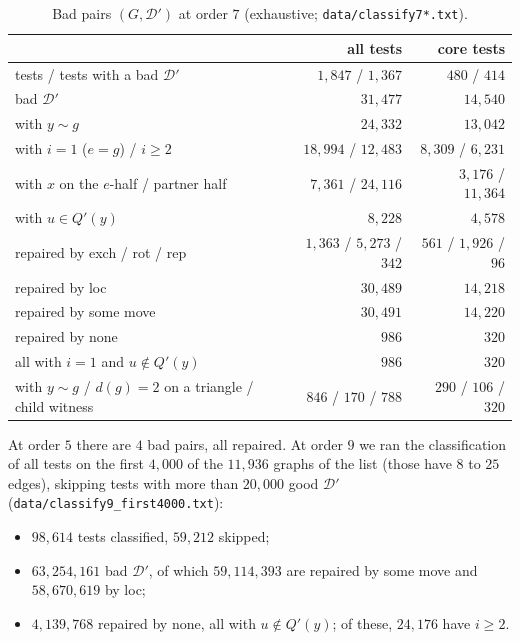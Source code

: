 \documentclass[11pt]{amsart}
\theoremstyle{definition}
\newcommand{\cD}{\mathcal D}
\begin{document}
\begin{table}[ht]
\caption{Bad pairs $(G,\cD')$ at order $7$ (exhaustive; \texttt{data/classify7*.txt}).}\label{tab:class7}
\small
\begin{tabular}{@{}lrr@{}}
\toprule
 & all tests & core tests\\
\midrule
tests / tests with a bad $\cD'$ & $1{,}847$ / $1{,}367$ & $480$ / $414$\\
bad $\cD'$ & $31{,}477$ & $14{,}540$\\
\quad with $y\sim g$ & $24{,}332$ & $13{,}042$\\
\quad with $i=1$ ($e=g$) / $i\ge2$ & $18{,}994$ / $12{,}483$ & $8{,}309$ / $6{,}231$\\
\quad with $x$ on the $e$-half / partner half & $7{,}361$ / $24{,}116$ & $3{,}176$ / $11{,}364$\\
\quad with $u\in Q'(y)$ & $8{,}228$ & $4{,}578$\\
repaired by exch / rot / rep & $1{,}363$ / $5{,}273$ / $342$ & $561$ / $1{,}926$ / $96$\\
repaired by loc & $30{,}489$ & $14{,}218$\\
repaired by some move & $30{,}491$ & $14{,}220$\\
repaired by none & $986$ & $320$\\
\quad all with $i=1$ and $u\notin Q'(y)$ & $986$ & $320$\\
\quad with $y\sim g$ / $d(g)=2$ on a triangle / child witness & $846$ / $170$ / $788$ & $290$ / $106$ / $320$\\
\bottomrule
\end{tabular}
\end{table}

At order $5$ there are $4$ bad pairs, all repaired. At order $9$ we ran the classification of all
tests on the first $4{,}000$ of the $11{,}936$ graphs of the list (those have $8$ to $25$ edges),
skipping tests with more than $20{,}000$ good $\cD'$ (\texttt{data/classify9\_first4000.txt}):
\begin{itemize}
\item $98{,}614$ tests classified, $59{,}212$ skipped;
\item $63{,}254{,}161$ bad $\cD'$, of which $59{,}114{,}393$ are repaired by some move and
$58{,}670{,}619$ by loc;
\item $4{,}139{,}768$ repaired by none, all with $u\notin Q'(y)$; of these, $24{,}176$ have $i\ge2$.
\end{itemize}
\end{document}
